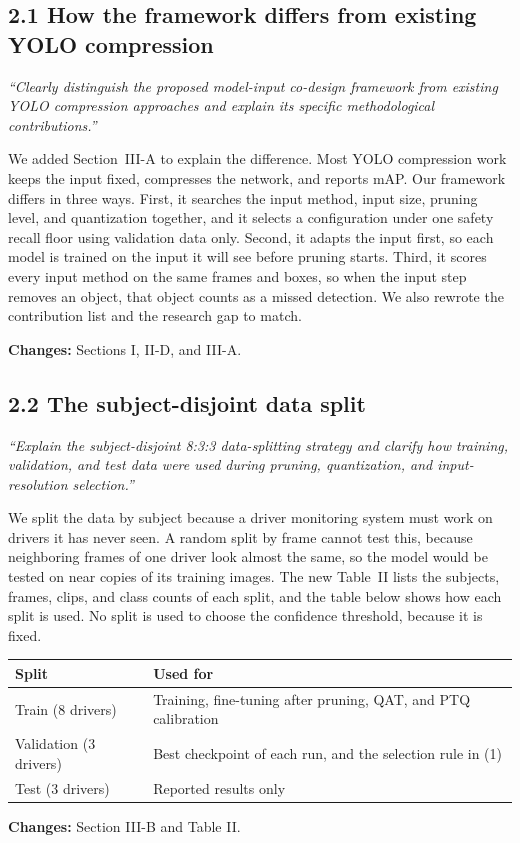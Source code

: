 \documentclass[10pt]{article}
\newcommand{\comment}[2]{\subsection*{#1}\textit{#2}\par}
\newcommand{\changes}[1]{\par\textbf{Changes:} #1}
\begin{document}
\comment{2.1 How the framework differs from existing YOLO compression}{``Clearly distinguish the proposed model-input co-design framework from existing YOLO compression approaches and explain its specific methodological contributions.''}
We added Section~III-A to explain the difference. Most YOLO compression work keeps the input fixed, compresses the network, and reports mAP. Our framework differs in three ways. First, it searches the input method, input size, pruning level, and quantization together, and it selects a configuration under one safety recall floor using validation data only. Second, it adapts the input first, so each model is trained on the input it will see before pruning starts. Third, it scores every input method on the same frames and boxes, so when the input step removes an object, that object counts as a missed detection. We also rewrote the contribution list and the research gap to match.
\changes{Sections I, II-D, and III-A.}

\comment{2.2 The subject-disjoint data split}{``Explain the subject-disjoint 8:3:3 data-splitting strategy and clarify how training, validation, and test data were used during pruning, quantization, and input-resolution selection.''}
We split the data by subject because a driver monitoring system must work on drivers it has never seen. A random split by frame cannot test this, because neighboring frames of one driver look almost the same, so the model would be tested on near copies of its training images. The new Table~II lists the subjects, frames, clips, and class counts of each split, and the table below shows how each split is used. No split is used to choose the confidence threshold, because it is fixed.

\begin{tabular}{@{}ll@{}}
\toprule
Split & Used for \\
\midrule
Train (8 drivers) & Training, fine-tuning after pruning, QAT, and PTQ calibration \\
Validation (3 drivers) & Best checkpoint of each run, and the selection rule in (1) \\
Test (3 drivers) & Reported results only \\
\bottomrule
\end{tabular}
\changes{Section III-B and Table II.}
\end{document}
